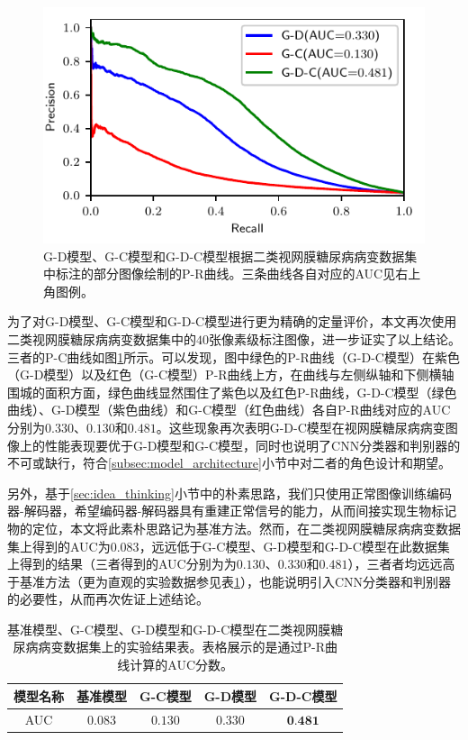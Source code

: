 \begin{figure}[h]
	\centering
	\includegraphics[width=1.0\textwidth]{figure/pr_cureve_u_d_u_c_u_d_c_components.pdf}
	\caption{G-D模型、G-C模型和G-D-C模型根据二类视网膜糖尿病病变数据集中标注的部分图像绘制的P-R曲线。三条曲线各自对应的AUC见右上角图例。} 
	\label{fig:u_d_c_comparation_pr_curve}
\end{figure}

为了对G-D模型、G-C模型和G-D-C模型进行更为精确的定量评价，本文再次使用二类视网膜糖尿病病变数据集中的$40$张像素级标注图像，进一步证实了以上结论。三者的P-C曲线如图\ref{fig:u_d_c_comparation_pr_curve}所示。可以发现，图中绿色的P-R曲线（G-D-C模型）在紫色（G-D模型）以及红色（G-C模型）P-R曲线上方，在曲线与左侧纵轴和下侧横轴围城的面积方面，绿色曲线显然围住了紫色以及红色P-R曲线，G-D-C模型（绿色曲线）、G-D模型（紫色曲线）和G-C模型（红色曲线）各自P-R曲线对应的AUC分别为$0.330$、$0.130$和$0.481$。这些现象再次表明G-D-C模型在视网膜糖尿病病变图像上的性能表现要优于G-D模型和G-C模型，同时也说明了CNN分类器和判别器的不可或缺行，符合\ref{subsec:model_architecture}小节中对二者的角色设计和期望。

另外，基于\ref{sec:idea_thinking}小节中的朴素思路，我们只使用正常图像训练编码器-解码器，希望编码器-解码器具有重建正常信号的能力，从而间接实现生物标记物的定位，本文将此素朴思路记为基准方法。然而，在二类视网膜糖尿病病变数据集上得到的AUC为$0.083$，远远低于G-C模型、G-D模型和G-D-C模型在此数据集上得到的结果（三者得到的AUC分别为为$0.130$、$0.330$和$0.481$），三者者均远远高于基准方法（更为直观的实验数据参见表\ref{tab:baseline_compared_diabetic_ds}），也能说明引入CNN分类器和判别器的必要性，从而再次佐证上述结论。
\begin{table}[h]
	\centering
	\caption{基准模型、G-C模型、G-D模型和G-D-C模型在二类视网膜糖尿病病变数据集上的实验结果表。表格展示的是通过P-R曲线计算的AUC分数。}		
	\label{tab:baseline_compared_diabetic_ds}
	\begin{tabular}{c|c|c|c|c}
		\toprule[2pt]
		模型名称 & 基准模型 & G-C模型 &G-D模型&G-D-C模型 \\
		\midrule[2pt]
		AUC	& $0.083$&	$0.130$ & $0.330$ & $\textbf{0.481}$	 \\
		\bottomrule[2pt]
	\end{tabular}
\end{table}

